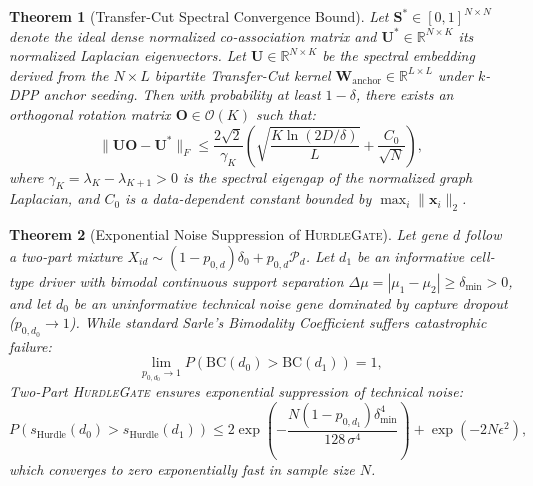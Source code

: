 \documentclass[preprint,12pt]{elsarticle}
\newtheorem{theorem}{Theorem}
\begin{document}
\begin{theorem}[Transfer-Cut Spectral Convergence Bound]\label{thm:spectral_bound}
Let $\mathbf{S}^* \in [0, 1]^{N \times N}$ denote the ideal dense normalized co-association matrix and $\mathbf{U}^* \in \mathbb{R}^{N \times K}$ its normalized Laplacian eigenvectors. Let $\mathbf{U} \in \mathbb{R}^{N \times K}$ be the spectral embedding derived from the $N \times L$ bipartite Transfer-Cut kernel $\mathbf{W}_{\text{anchor}} \in \mathbb{R}^{L \times L}$ under $k$-DPP anchor seeding. Then with probability at least $1 - \delta$, there exists an orthogonal rotation matrix $\mathbf{O} \in \mathcal{O}(K)$ such that:
\begin{equation}
    \|\mathbf{U}\mathbf{O} - \mathbf{U}^*\|_F \le \frac{2 \sqrt{2}}{\gamma_K} \left( \sqrt{\frac{K \ln(2D/\delta)}{L}} + \frac{C_0}{\sqrt{N}} \right),
\end{equation}
where $\gamma_K = \lambda_K - \lambda_{K+1} > 0$ is the spectral eigengap of the normalized graph Laplacian, and $C_0$ is a data-dependent constant bounded by $\max_i \|\mathbf{x}_i\|_2$.
\end{theorem}

\begin{theorem}[Exponential Noise Suppression of \textsc{HurdleGate}]\label{thm:hurdle_bound}
Let gene $d$ follow a two-part mixture $X_{id} \sim (1 - p_{0, d})\delta_0 + p_{0, d}\mathcal{P}_d$. Let $d_1$ be an informative cell-type driver with bimodal continuous support separation $\Delta\mu = |\mu_1 - \mu_2| \ge \delta_{\min} > 0$, and let $d_0$ be an uninformative technical noise gene dominated by capture dropout ($p_{0, d_0} \to 1$). While standard Sarle's Bimodality Coefficient suffers catastrophic failure:
\begin{equation}
    \lim_{p_{0, d_0} \to 1} P\left(\text{BC}(d_0) > \text{BC}(d_1)\right) = 1,
\end{equation}
Two-Part \textsc{HurdleGate} ensures exponential suppression of technical noise:
\begin{equation}
    P\left(s_{\text{Hurdle}}(d_0) > s_{\text{Hurdle}}(d_1)\right) \le 2 \exp\left( - \frac{N (1 - p_{0, d_1}) \delta_{\min}^4}{128 \, \sigma^4} \right) + \exp(-2 N \epsilon^2),
\end{equation}
which converges to zero exponentially fast in sample size $N$.
\end{theorem}
\end{document}

